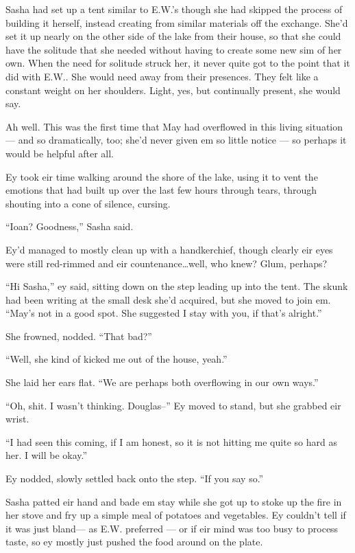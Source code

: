 Sasha had set up a tent similar to E.W.'s though she had skipped the process of building it herself, instead creating from similar materials off the exchange. She'd set it up nearly on the other side of the lake from their house, so that she could have the solitude that she needed without having to create some new sim of her own. When the need for solitude struck her, it never quite got to the point that it did with E.W.. She would need away from their presences. They felt like a constant weight on her shoulders. Light, yes, but continually present, she would say.

Ah well. This was the first time that May had overflowed in this living situation — and so dramatically, too; she'd never given em so little notice — so perhaps it would be helpful after all.

Ey took eir time walking around the shore of the lake, using it to vent the emotions that had built up over the last few hours through tears, through shouting into a cone of silence, cursing.

``Ioan? Goodness,'' Sasha said.

Ey'd managed to mostly clean up with a handkerchief, though clearly eir eyes were still red-rimmed and eir countenance\ldots well, who knew? Glum, perhaps?

``Hi Sasha,'' ey said, sitting down on the step leading up into the tent. The skunk had been writing at the small desk she'd acquired, but she moved to join em. ``May's not in a good spot. She suggested I stay with you, if that's alright.''

She frowned, nodded. ``That bad?''

``Well, she kind of kicked me out of the house, yeah.''

She laid her ears flat. ``We are perhaps both overflowing in our own ways.''

``Oh, shit. I wasn't thinking. Douglas--'' Ey moved to stand, but she grabbed eir wrist.

``I had seen this coming, if I am honest, so it is not hitting me quite so hard as her. I will be okay.''

Ey nodded, slowly settled back onto the step. ``If you say so.''

Sasha patted eir hand and bade em stay while she got up to stoke up the fire in her stove and fry up a simple meal of potatoes and vegetables. Ey couldn't tell if it was just bland— as E.W. preferred — or if eir mind was too busy to process taste, so ey mostly just pushed the food around on the plate.

